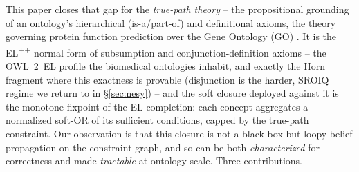\documentclass[anon]{nesy2026}
\begin{document}
This paper closes that gap for the \emph{true-path theory} -- the propositional grounding of
an ontology's hierarchical (is-a/part-of) and definitional axioms, the theory governing
protein function prediction over the Gene Ontology (GO)
\citep{ashburner2000go,geneontology2023}. It is the EL\textsuperscript{++} normal form of
subsumption and conjunction-definition axioms \citep{baader2005elenvelope,kazakov2014elk} -- the
OWL~2~EL profile the biomedical ontologies inhabit, and exactly the Horn fragment where this
exactness is provable (disjunction is the harder, SROIQ regime we return to in \S\ref{sec:nesy}) -- 
and the soft closure deployed against it is the monotone fixpoint of the EL completion: each
concept aggregates a normalized soft-OR of its sufficient conditions, capped by the
true-path constraint. Our observation is that this closure is not a black box but loopy
belief propagation \citep{pearl1988probabilistic} on the constraint graph, and so can be
both \emph{characterized} for correctness and made \emph{tractable} at ontology scale. Three
contributions.
\end{document}
